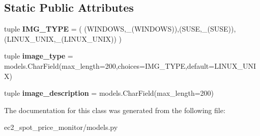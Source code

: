 \subsection*{Static Public Attributes}
\begin{DoxyCompactItemize}
\item 
\hypertarget{classec2__spot__price__monitor_1_1models_1_1ImageType_a2f86dfc4b4b26b5e0535309f1a31779a}{tuple {\bfseries I\-M\-G\-\_\-\-T\-Y\-P\-E} = ( (W\-I\-N\-D\-O\-W\-S,\-\_\-(W\-I\-N\-D\-O\-W\-S)),(S\-U\-S\-E,\-\_\-(S\-U\-S\-E)),(L\-I\-N\-U\-X\-\_\-\-U\-N\-I\-X,\-\_\-(L\-I\-N\-U\-X\-\_\-\-U\-N\-I\-X)) )}\label{classec2__spot__price__monitor_1_1models_1_1ImageType_a2f86dfc4b4b26b5e0535309f1a31779a}

\item 
\hypertarget{classec2__spot__price__monitor_1_1models_1_1ImageType_adadc15e00516b69e8ddbae8e63bbe4f2}{tuple {\bfseries image\-\_\-type} = models.\-Char\-Field(max\-\_\-length=200,choices=I\-M\-G\-\_\-\-T\-Y\-P\-E,default=L\-I\-N\-U\-X\-\_\-\-U\-N\-I\-X)}\label{classec2__spot__price__monitor_1_1models_1_1ImageType_adadc15e00516b69e8ddbae8e63bbe4f2}

\item 
\hypertarget{classec2__spot__price__monitor_1_1models_1_1ImageType_a49c505e6e8fd1e2bca688501752a312a}{tuple {\bfseries image\-\_\-description} = models.\-Char\-Field(max\-\_\-length=200)}\label{classec2__spot__price__monitor_1_1models_1_1ImageType_a49c505e6e8fd1e2bca688501752a312a}

\end{DoxyCompactItemize}


The documentation for this class was generated from the following file\-:\begin{DoxyCompactItemize}
\item 
ec2\-\_\-spot\-\_\-price\-\_\-monitor/models.\-py\end{DoxyCompactItemize}
